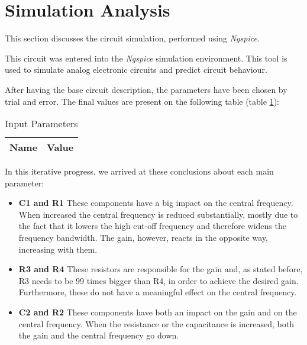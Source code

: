 \section{Simulation Analysis}
\label{sec:simulation}



\indent
 
This section discusses the circuit simulation, performed using {\it Ngspice}. 

This circuit was entered into the {\it Ngspice} simulation environment. This tool is used to simulate analog electronic circuits and predict circuit behaviour. 

After having the base circuit description, the parameters have been chosen by trial and error. The final values are present on the following table (table \ref{tab:InputParam}):

\begin{table}[H]
  \centering
  \begin{tabular}{|l|r|}
    \hline    
    {\bf Name} & {\bf Value} \\ \hline
    
  \end{tabular}
  \caption{Input Parameters}
  \label{tab:InputParam}
\end{table}


In this iterative progress, we arrived at these conclusions about each main parameter:
 

\begin{itemize}
    \item\textbf{C1 and R1}
    These components have a big impact on the central frequency. When increased the central frequency is reduced substantially, mostly due to the fact that it lowers the high cut-off frequency and therefore widens the frequency bandwidth. The gain, however, reacts in the opposite way, increasing with them.
    \item\textbf{R3 and R4}
    These resistors are responsible for the gain and, as stated before, R3 needs to be 99 times bigger than R4, in order to achieve the desired gain. Furthermore, these do not have a meaningful effect on the central frequency.
    \item\textbf{C2 and R2}
     These components have both an impact on the gain and on the central frequency. When the resistance or the capacitance is increased, both the gain and the central frequency go down. 
     
\end{itemize}    

